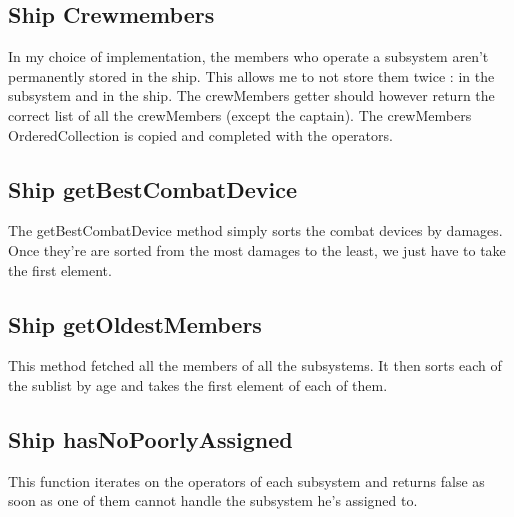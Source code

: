 \documentclass[12pt,a4paper]{scrartcl}
\begin{document}
\subsection{Ship Crewmembers}
In my choice of implementation, the members who operate a subsystem aren't permanently stored in the ship. This allows me to not store them twice : in the subsystem and in the ship. The crewMembers getter should however return the correct list of all the crewMembers (except the captain). The crewMembers OrderedCollection is copied and completed with the operators.

\subsection{Ship getBestCombatDevice}
The getBestCombatDevice method simply sorts the combat devices by damages. Once they're are sorted from the most damages to the least, we just have to take the first element.

\subsection{Ship getOldestMembers}
This method fetched all the members of all the subsystems. It then sorts each of the sublist by age and takes the first element of each of them.

\subsection{Ship hasNoPoorlyAssigned}
This function iterates on the operators of each subsystem and returns false as soon as one of them cannot handle the subsystem he's assigned to.
\end{document}

